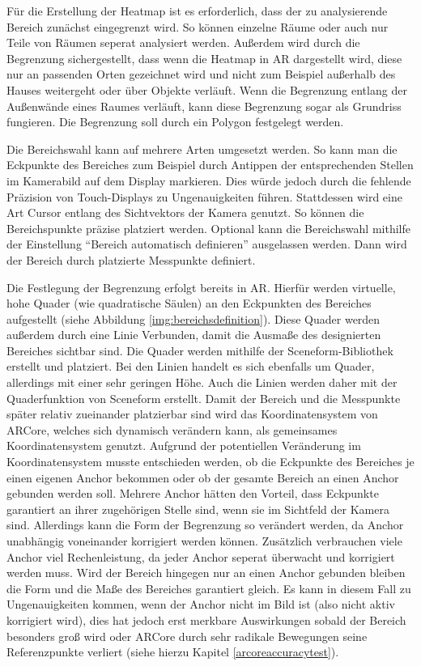 \documentclass[10pt]{scrartcl}
\begin{document}
Für die Erstellung der Heatmap ist es erforderlich, dass der zu analysierende Bereich zunächst eingegrenzt wird. So können einzelne Räume oder auch nur Teile von Räumen seperat analysiert werden. Außerdem wird durch die Begrenzung sichergestellt, dass wenn die Heatmap in AR dargestellt wird, diese nur an passenden Orten gezeichnet wird und nicht zum Beispiel außerhalb des Hauses weitergeht oder über Objekte verläuft. Wenn die Begrenzung entlang der Außenwände eines Raumes verläuft, kann diese Begrenzung sogar als Grundriss fungieren. Die Begrenzung soll durch ein Polygon festgelegt werden.

Die Bereichswahl kann auf mehrere Arten umgesetzt werden. So kann man die Eckpunkte des Bereiches zum Beispiel durch Antippen der entsprechenden Stellen im Kamerabild auf dem Display markieren. Dies würde jedoch durch die fehlende Präzision von Touch-Displays zu Ungenauigkeiten führen. Stattdessen wird eine Art Cursor entlang des Sichtvektors der Kamera genutzt. So können die Bereichspunkte präzise platziert werden. Optional kann die Bereichswahl mithilfe der Einstellung \enquote{Bereich automatisch definieren} ausgelassen werden. Dann wird der Bereich durch platzierte Messpunkte definiert.

Die Festlegung der Begrenzung erfolgt bereits in AR. Hierfür werden virtuelle, hohe Quader (wie quadratische Säulen) an den Eckpunkten des Bereiches aufgestellt (siehe Abbildung \ref{img:bereichsdefinition}). Diese Quader werden außerdem durch eine Linie Verbunden, damit die Ausmaße des designierten Bereiches sichtbar sind. Die Quader werden mithilfe der Sceneform-Bibliothek erstellt und platziert. Bei den Linien handelt es sich ebenfalls um Quader, allerdings mit einer sehr geringen Höhe. Auch die Linien werden daher mit der Quaderfunktion von Sceneform erstellt. Damit der Bereich und die Messpunkte später relativ zueinander platzierbar sind wird das Koordinatensystem von ARCore, welches sich dynamisch verändern kann, als gemeinsames Koordinatensystem genutzt. Aufgrund der potentiellen Veränderung im Koordinatensystem musste entschieden werden, ob die Eckpunkte des Bereiches je einen eigenen Anchor bekommen oder ob der gesamte Bereich an einen Anchor gebunden werden soll. Mehrere Anchor hätten den Vorteil, dass Eckpunkte garantiert an ihrer zugehörigen Stelle sind, wenn sie im Sichtfeld der Kamera sind. Allerdings kann die Form der Begrenzung so verändert werden, da Anchor unabhängig voneinander korrigiert werden können. Zusätzlich verbrauchen viele Anchor viel Rechenleistung, da jeder Anchor seperat überwacht und korrigiert werden muss. Wird der Bereich hingegen nur an einen Anchor gebunden bleiben die Form und die Maße des Bereiches garantiert gleich. Es kann in diesem Fall zu Ungenauigkeiten kommen, wenn der Anchor nicht im Bild ist (also nicht aktiv korrigiert wird), dies hat jedoch erst merkbare Auswirkungen sobald der Bereich besonders groß wird oder ARCore durch sehr radikale Bewegungen seine Referenzpunkte verliert (siehe hierzu Kapitel \ref{arcoreaccuracytest}).
\end{document}
